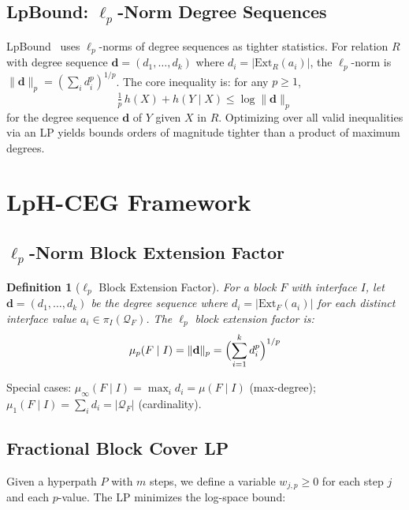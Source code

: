 \documentclass[sigconf, nonacm, acmthm=false]{acmart}
\newcommand{\query}{\mathcal{Q}}
\newcommand{\rel}{R}
\newcommand{\block}{F}
\newcommand{\interface}{I}
\newcommand{\muFactor}[2]{\mu(#1 \mid #2)}
\newcommand{\muLp}[3]{\mu_{#1}(#2 \mid #3)}
\newcommand{\ext}[2]{\text{Ext}_{#1}(#2)}
\newcommand{\lpnorm}[2]{\|#1\|_{#2}}
\newtheorem{definition}{Definition}
\begin{document}
\subsection{\texorpdfstring{LpBound: $\ell_p$-Norm Degree Sequences}{LpBound: lp-Norm Degree Sequences}}

LpBound~\cite{zhang2025lpbound} uses $\ell_p$-norms of degree
sequences as tighter statistics.
For relation $\rel$ with degree sequence
$\mathbf{d} = (d_1, \ldots, d_k)$ where
$d_i = |\ext{\rel}{a_i}|$, the $\ell_p$-norm is
$\lpnorm{\mathbf{d}}{p} = (\sum_i d_i^p)^{1/p}$.
The core inequality is: for any $p \ge 1$,
\[
\tfrac{1}{p}\, h(X) + h(Y \mid X) \le \log \lpnorm{\mathbf{d}}{p}
\]
for the degree sequence $\mathbf{d}$ of $Y$ given $X$ in $\rel$.
Optimizing over all valid inequalities via an LP yields bounds
orders of magnitude tighter than a product of maximum degrees.

\section{LpH-CEG Framework}
\label{sec:framework}

\subsection{\texorpdfstring{$\ell_p$-Norm Block Extension Factor}{lp-Norm Block Extension Factor}}

\begin{definition}[$\ell_p$ Block Extension Factor]
\label{def:lp-mu}
For a block $\block$ with interface $\interface$, let
$\mathbf{d} = (d_1, \ldots, d_k)$ be the degree sequence where
$d_i = |\ext{\block}{a_i}|$ for each distinct interface value
$a_i \in \pi_\interface(\query_\block)$.
The $\ell_p$ block extension factor is:
\[
\muLp{p}{\block}{\interface} = \lpnorm{\mathbf{d}}{p}
= \Bigl(\sum_{i=1}^{k} d_i^p\Bigr)^{1/p}
\]
\end{definition}

\noindent Special cases:
$\muLp{\infty}{\block}{\interface} = \max_i d_i = \muFactor{\block}{\interface}$ (max-degree);
$\muLp{1}{\block}{\interface} = \sum_i d_i = |\query_\block|$ (cardinality).

\subsection{Fractional Block Cover LP}

Given a hyperpath $P$ with $m$ steps, we define a variable
$w_{j,p} \ge 0$ for each step $j$ and each $p$-value.
The LP minimizes the log-space bound:
\end{document}
